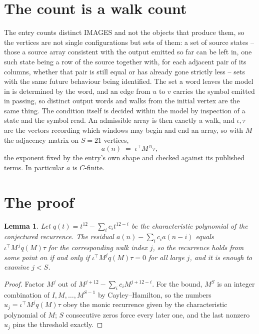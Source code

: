 \documentclass[11pt,a4paper]{article}
\theoremstyle{plain}
\newtheorem{lemma}[theorem]{Lemma}
\theoremstyle{definition}
\begin{document}
\section{The count is a walk count}

The entry counts distinct IMAGES and not the objects that produce them, so the vertices are not single configurations but sets of them: a set of source states -- those a source array consistent with the output emitted so far can be left in, one such state being a row of the source together with, for each adjacent pair of its columns, whether that pair is still equal or has already gone strictly less -- sets with the same future behaviour being identified. The set a word leaves the model in is determined by the word, and an edge from $u$ to $v$ carries the symbol emitted in passing, so distinct output words and walks from the initial vertex are the same thing. The condition itself is decided within the model by inspection of a state and the symbol read.
An admissible array is then exactly a walk, and $\iota,\tau$ are the vectors recording which windows may begin and end an array, so with $M$ the adjacency matrix on $S=21$ vertices,
\[
a(n)\;=\;\iota^{\!\top}M^{\,n}\tau ,
\]
the exponent fixed by the entry's own shape and checked against its published terms. In
particular $a$ is $C$-finite.

\section{The proof}

\begin{lemma}\label{lem:crit}
Let $q(t)=t^{12}-\sum_i c_it^{12-i}$ be the characteristic polynomial of the
conjectured recurrence. The residual $a(n)-\sum_ic_ia(n-i)$ equals
$\iota^{\!\top}M^{\,j}q(M)\tau$ for the corresponding walk index $j$, so the recurrence
holds from some point on if and only if $\iota^{\!\top}M^{j}q(M)\tau=0$ for all large $j$,
and it is enough to examine $j<S$.
\end{lemma}

\begin{proof}
Factor $M^{j}$ out of $M^{j+12}-\sum_ic_iM^{j+12-i}$. For the bound, $M^{S}$
is an integer combination of $I,M,\dots,M^{S-1}$ by Cayley--Hamilton, so the numbers
$u_j=\iota^{\!\top}M^{j}q(M)\tau$ obey the monic recurrence given by the characteristic
polynomial of $M$; $S$ consecutive zeros force every later one, and the last nonzero $u_j$
pins the threshold exactly.
\end{proof}
\end{document}
